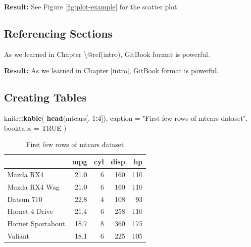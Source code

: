 \documentclass[
]{book}
\newenvironment{Shaded}{\begin{snugshade}}{\end{snugshade}}
\newcommand{\AttributeTok}[1]{\textcolor[rgb]{0.13,0.29,0.53}{#1}}
\newcommand{\ConstantTok}[1]{\textcolor[rgb]{0.56,0.35,0.01}{#1}}
\newcommand{\DecValTok}[1]{\textcolor[rgb]{0.00,0.00,0.81}{#1}}
\newcommand{\FunctionTok}[1]{\textcolor[rgb]{0.13,0.29,0.53}{\textbf{#1}}}
\newcommand{\NormalTok}[1]{#1}
\newcommand{\SpecialCharTok}[1]{\textcolor[rgb]{0.81,0.36,0.00}{\textbf{#1}}}
\newcommand{\StringTok}[1]{\textcolor[rgb]{0.31,0.60,0.02}{#1}}
\begin{document}
\textbf{Result:} See Figure \ref{fig:plot-example} for the scatter plot.

\subsection{Referencing Sections}\label{referencing-sections}

\begin{Shaded}
\begin{Highlighting}[]
\NormalTok{As we learned in Chapter \textbackslash{}@ref(intro), GitBook format is powerful.}
\end{Highlighting}
\end{Shaded}

\textbf{Result:} As we learned in Chapter \ref{intro}, GitBook format is powerful.

\subsection{Creating Tables}\label{creating-tables}

\begin{Shaded}
\begin{Highlighting}[]
\NormalTok{knitr}\SpecialCharTok{::}\FunctionTok{kable}\NormalTok{(}
  \FunctionTok{head}\NormalTok{(mtcars[, }\DecValTok{1}\SpecialCharTok{:}\DecValTok{4}\NormalTok{]), }
  \AttributeTok{caption =} \StringTok{"First few rows of mtcars dataset"}\NormalTok{,}
  \AttributeTok{booktabs =} \ConstantTok{TRUE}
\NormalTok{)}
\end{Highlighting}
\end{Shaded}

\begin{table}

\caption{\label{tab:cars-table}First few rows of mtcars dataset}
\centering
\begin{tabular}[t]{lrrrr}
\toprule
  & mpg & cyl & disp & hp\\
\midrule
Mazda RX4 & 21.0 & 6 & 160 & 110\\
Mazda RX4 Wag & 21.0 & 6 & 160 & 110\\
Datsun 710 & 22.8 & 4 & 108 & 93\\
Hornet 4 Drive & 21.4 & 6 & 258 & 110\\
Hornet Sportabout & 18.7 & 8 & 360 & 175\\
\addlinespace
Valiant & 18.1 & 6 & 225 & 105\\
\bottomrule
\end{tabular}
\end{table}
\end{document}

